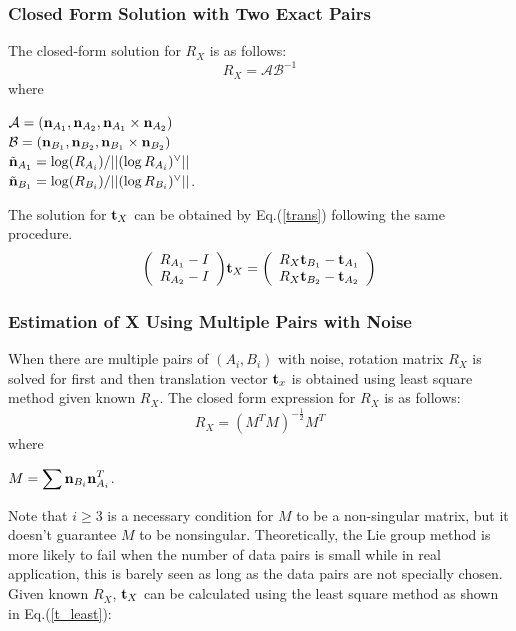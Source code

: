 \documentclass[twocolumn,10pt]{asme2ej}
\newcommand{\nn}{{\bf n}}
\newcommand{\ttt}{{\bf t}}
\begin{document}
\subsubsection{Closed Form Solution with Two Exact Pairs}
The closed-form solution for $R_{X}$ is as follows:
\begin{equation}
R_{X} = \mathcal{A}\mathcal{B}^{-1}
\label{Lie_Rotation}
\end{equation}
where\\

\begin{center}
$\mathcal{A} = (\nn_{A_{1}}, \nn_{A_{2}}, \nn_{A_{1}} \times \nn_{A_{2}})$\\
 $\mathcal{B} = (\nn_{B_{1}}, \nn_{B_{2}}, \nn_{B_{1}} \times \nn_{B_{2}})$\\
$\tilde{\nn}_{A_{1}} = \log(R_{A_{i}})/||(\log R_{A_{i}})^{\vee}||$\\
$\tilde{\nn}_{B_{1}} = \log(R_{B_{i}})/||(\log R_{B_{i}})^{\vee}||$.
\end{center}
The solution for $\ttt_{X}$ can be obtained by Eq.(\ref{trans}) following the same procedure.\\
\begin{equation}
\bigg(\begin{array}{lr}
R_{A_{1}} - I \\
R_{A_{2}} - I
\end{array}\bigg)\ttt_{X}=
\bigg(\begin{array}{lr}
R_{X}\ttt_{B_{1}} - \ttt_{A_{1}}\\
R_{X}\ttt_{B_{2}} - \ttt_{A_{2}}
\end{array}
\bigg)
\label{Lie_Translation}
\end{equation}

\subsubsection{Estimation of X Using Multiple Pairs with Noise}
When there are multiple pairs of $(A_{i}, B_{i})$ with noise, rotation matrix $R_{X}$ is solved for first and then translation vector $\ttt_{x}$ is obtained using least square method given known $R_{X}$. The closed form expression for $R_{X}$ is as follows:
\begin{equation}
R_{X} = (M^{T}M)^{-\frac{1}{2}}M^{T}
\end{equation}
where \\
\begin{center}
$M = \mathlarger{\sum{\nn_{B_{i}} \nn_{A_{i}}^{T}}}$.
\end{center}
Note that $i \geq 3$ is a necessary condition for $M$ to be a non-singular matrix, but it doesn't guarantee $M$ to be nonsingular. Theoretically, the Lie group method is more likely to fail when the number of data pairs is small while in real application, this is barely seen as long as the data pairs are not specially chosen. Given known $R_{X}$, $\ttt_{X}$ can be calculated using the least square method as shown in Eq.(\ref{t_least}):
\end{document}
